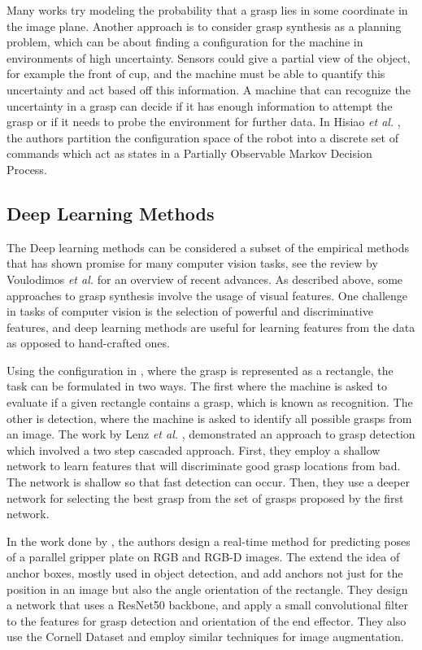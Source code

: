 \documentclass{article}
\begin{document}
Many works try modeling the probability that a grasp lies in some coordinate
in the image plane. Another approach is to consider grasp synthesis as a
planning problem, which can be about finding a configuration for the machine
in environments of high uncertainty. Sensors could
give a partial view of the object, for example the front of cup, and the machine
must be able to quantify this uncertainty and act based off this information.
A machine that can recognize the uncertainty in a grasp can decide if it has
enough information to attempt the grasp or if it needs to probe the environment
for further data. In Hisiao \textit{et al.} \cite{hsiao07}, the authors
partition the configuration space of the robot into a discrete set of commands
which act as states in a Partially Observable Markov Decision Process.

\subsection{Deep Learning Methods}
The Deep learning methods can be considered a subset of the empirical methods
that has shown promise for many computer vision tasks, see the review
by Voulodimos \textit{et al.} \cite{voulodimos18} for an overview of recent
advances. As described above, some approaches to grasp synthesis involve the
usage of visual features. One challenge in tasks of computer vision is the
selection of powerful and discriminative features, and deep learning methods
are useful for learning features from the data as opposed to hand-crafted ones.

Using the configuration in \cite{jiang11}, where the grasp is represented as
a rectangle, the task can be formulated in two ways.
The first where the machine is asked to evaluate if a given rectangle contains
a grasp, which is known as recognition. The other is detection, where the
machine is asked to identify all possible grasps from an image. The work by
Lenz \textit{et al.} \cite{lenz15}, demonstrated an approach to grasp
detection which involved a two step cascaded approach. First, they employ
a shallow network to learn features that will discriminate good grasp locations
from bad. The network is shallow so that fast detection can occur. Then, they
use a deeper network for selecting the best grasp from the set of grasps
proposed by the first network.

In the work done by \cite{zhou18, zhang18}, the authors design a real-time method
for predicting poses of a parallel gripper plate on RGB and RGB-D images. The extend
the idea
of anchor boxes, mostly used in object detection, and add anchors not just for the
position in an image but also the angle orientation of the rectangle. They design
a network that uses a ResNet50 backbone, and apply a small convolutional filter to
the features for grasp detection and orientation of the end effector. They also use
the Cornell Dataset and employ similar techniques for image augmentation.
\end{document}
